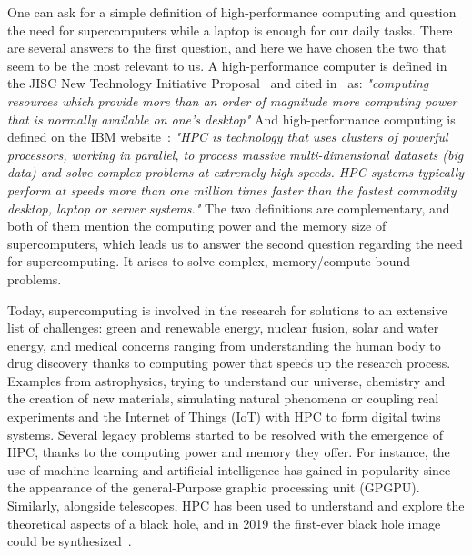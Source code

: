 One can ask for a simple definition of high-performance computing and question the need for supercomputers while a laptop is enough for our daily tasks. There are several answers to the first question, and here we have chosen the two that seem to be the most relevant to us.   
A high-performance computer is defined in the JISC New Technology Initiative Proposal~\cite{JISC} and cited in~\cite{hpc} as:
\textit{"computing resources which provide more than an order of magnitude more computing power that is normally available on one's desktop"} 
And high-performance computing is defined on the IBM website~\cite{ibm}: 
\textit{"HPC is technology that uses clusters of powerful processors, working in parallel, to process massive multi-dimensional datasets (big data) and solve complex problems at extremely high speeds. HPC systems typically perform at speeds more than one million times faster than the fastest commodity desktop, laptop or server systems."}
The two definitions are complementary, and both of them mention the computing power and the memory size of supercomputers, which leads us to answer the second question regarding the need for supercomputing. It arises to solve complex, memory/compute-bound problems. 



Today, supercomputing is involved in the research for solutions to an extensive list of challenges: green and renewable energy, nuclear fusion, solar and water energy, and medical concerns ranging from understanding the human body to drug discovery thanks to computing power that speeds up the research process. Examples from astrophysics, trying to understand our universe, chemistry and the creation of new materials, simulating natural phenomena or coupling real experiments and the Internet of Things (IoT) with HPC to form digital twins systems.
Several legacy problems started to be resolved with the emergence of HPC, thanks to the computing power and memory they offer. For instance, the use of machine learning and artificial intelligence has gained in popularity since the appearance of the general-Purpose graphic processing unit (GPGPU). Similarly, alongside telescopes, HPC has been used to understand and explore the theoretical aspects of a black hole, and in 2019 the first-ever black hole image could be synthesized~\cite{erotokritou_hpc_2019}.     

